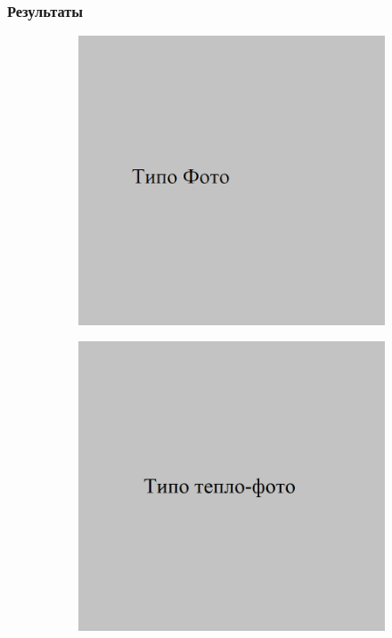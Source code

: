 \documentclass[t]{beamer}
\begin{document}
	\begin{frame}
		\frametitle{Результаты}
		\vspace*{0.65cm}
		\begin{figure}[ht!]
			\begin{subfigure}{.30\textwidth}
				\centering
				\includegraphics[width = \textwidth]{image/opt_examp}
				\caption{}
			\end{subfigure}
			\begin{subfigure}{.30\textwidth}
				\centering
				\includegraphics[width = \textwidth]{image/tep_examp}

\end{subfigure}
\end{figure}
\end{frame}
\end{document}
